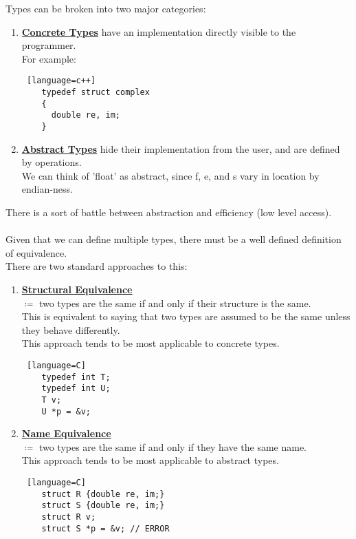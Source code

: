 \documentclass[../../lecture_notes.tex]{subfiles}
\begin{document}
Types can be broken into two major categories:
\begin{enumerate} [itemsep=0mm]
	\item \textbf{\underline{Concrete Types}} have an implementation directly visible to the programmer.\\
		For example:
			\begin{lstlisting} [language=c++]
	typedef struct complex
	{
	  double re, im;
	}
			\end{lstlisting}
	\item \textbf{\underline{Abstract Types}} hide their implementation from the user, and are defined by operations.\\
		We can think of 'float' as abstract, since f, e, and s vary in location by endian-ness.\\
\end{enumerate}
There is a sort of battle between abstraction and efficiency (low level access).\\
\\
Given that we can define multiple types, there must be a well defined definition of equivalence.\\
There are two standard approaches to this:
\begin{enumerate} [itemsep=0mm]
	\item \textbf{\underline{Structural Equivalence}}\\
		$\coloneqq$ two types are the same if and only if their structure is the same.\\
		This is equivalent to saying that two types are assumed to be the same unless they behave differently.\\
		This approach tends to be most applicable to concrete types.
		\begin{lstlisting} [language=C]
	typedef int T;
	typedef int U;
	T v;
	U *p = &v;
		\end{lstlisting}
	\item \textbf{\underline{Name Equivalence}}\\
		$\coloneqq$ two types are the same if and only if they have the same name.\\
		This approach tends to be most applicable to abstract types.
		\begin{lstlisting} [language=C]
	struct R {double re, im;}
	struct S {double re, im;}
	struct R v;
	struct S *p = &v; // ERROR
		\end{lstlisting}
\end{enumerate}
\end{document}
